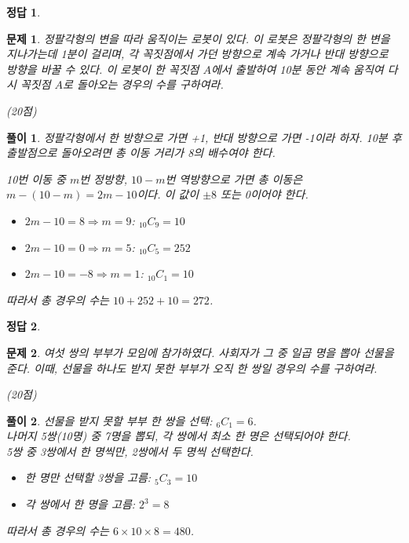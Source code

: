 \documentclass[12pt,a4paper]{article}
\theoremstyle{test_form}
\newtheorem{problem}{문제}[section]
\newtheorem*{solution}{풀이}
\newtheorem*{answer}{정답}
\begin{document}
\begin{answer}
\hfill {}
\end{answer}

\newpage

\begin{problem}
정팔각형의 변을 따라 움직이는 로봇이 있다. 이 로봇은 정팔각형의 한 변을 지나가는데 1분이 걸리며, 각 꼭짓점에서 가던 방향으로 계속 가거나 반대 방향으로 방향을 바꿀 수 있다. 이 로봇이 한 꼭짓점 \(A\)에서 출발하여 10분 동안 계속 움직여 다시 꼭짓점 \(A\)로 돌아오는 경우의 수를 구하여라.
\begin{flushright}(20점)\end{flushright}
\end{problem}

\begin{solution}
    \setlength{\parindent}{0pt}
    정팔각형에서 한 방향으로 가면 +1, 반대 방향으로 가면 -1이라 하자. 10분 후 출발점으로 돌아오려면 총 이동 거리가 8의 배수여야 한다.

10번 이동 중 \(m\)번 정방향, \(10-m\)번 역방향으로 가면 총 이동은 \(m-(10-m)=2m-10\)이다. 이 값이 \(\pm8\) 또는 0이어야 한다. \\

\begin{itemize}
\item \(2m-10=8 \Rightarrow m=9\): \(_{10}C_9=10\)
\item \(2m-10=0 \Rightarrow m=5\): \(_{10}C_5=252\)
\item \(2m-10=-8 \Rightarrow m=1\): \(_{10}C_1=10\)
\end{itemize}

따라서 총 경우의 수는 \(10+252+10=272\).
\end{solution}

\begin{answer}
\hfill {}
\end{answer}

\newpage

\begin{problem}
여섯 쌍의 부부가 모임에 참가하였다. 사회자가 그 중 일곱 명을 뽑아 선물을 준다. 이때, 선물을 하나도 받지 못한 부부가 오직 한 쌍일 경우의 수를 구하여라.
\begin{flushright}(20점)\end{flushright}
\end{problem}

\begin{solution}
    \setlength{\parindent}{0pt}
    선물을 받지 못할 부부 한 쌍을 선택: \(_6C_1=6\). \\
    나머지 5쌍(10명) 중 7명을 뽑되, 각 쌍에서 최소 한 명은 선택되어야 한다. \\ 
    5쌍 중 3쌍에서 한 명씩만, 2쌍에서 두 명씩 선택한다. \\

\begin{itemize}
\item 한 명만 선택할 3쌍을 고름: \(_5C_3=10\)
\item 각 쌍에서 한 명을 고름: \(2^3=8\)
\end{itemize}

따라서 총 경우의 수는 \(6 \times 10 \times 8 = 480\).
\end{solution}
\end{document}
